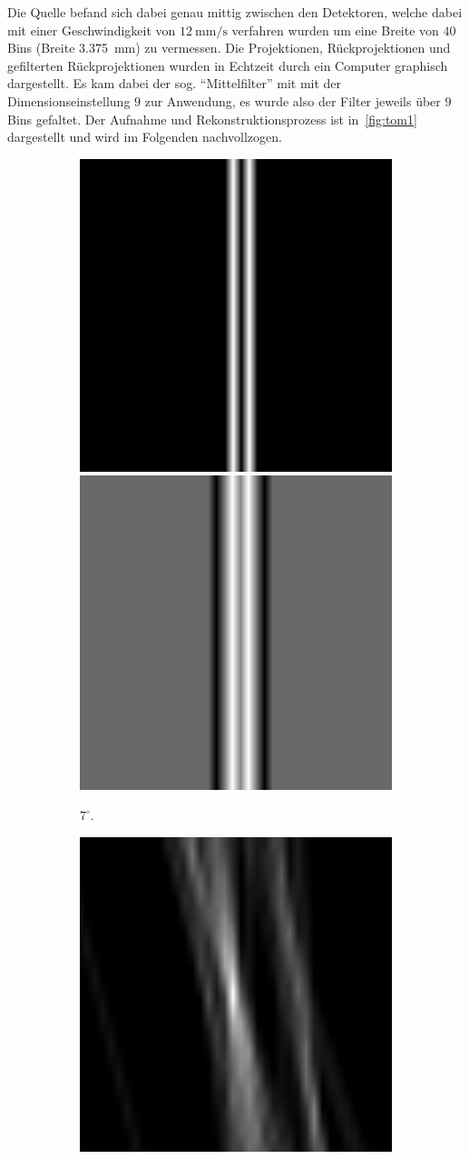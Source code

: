 \documentclass[slug=PET, room=Andreas-Schubert-Bau\,\ 424A, supervisor=Carsten\ Bittrich, coursedate=10.\ 01.\ 2020]{../../Lab_Report_LaTeX/lab_report}
\begin{document}
Die Quelle befand sich dabei genau mittig zwischen den Detektoren,
welche dabei mit einer Geschwindigkeit von
\(\SI{12}{\milli\metre\per\second}\) verfahren wurden um eine Breite
von \(40\) Bins (Breite \SI{3.375}{\milli\meter}) zu vermessen. Die
Projektionen, R\"uckprojektionen und gefilterten R\"uckprojektionen
wurden in Echtzeit durch ein Computer graphisch dargestellt. Es kam
dabei der sog. ``Mittelfilter'' mit mit der Dimensionseinstellung
\(9\) zur Anwendung, es wurde also der Filter jeweils \"uber \(9\)
Bins gefaltet. Der Aufnahme und Rekonstruktionsprozess ist
in~\ref{fig:tom1} dargestellt und wird im Folgenden nachvollzogen.

\begin{figure}[htp]
  \begin{subfigure}{0.5\textwidth}
    \centering
    \includegraphics[width=.4\textwidth]{../messungen/oliTOM1/1_einfach.png}
    \includegraphics[width=.4\textwidth]{../messungen/oliTOM1/1_gefiltert.png}
    \caption{\(7^\circ\).}
    \label{eq:tom1-7}
  \end{subfigure}
  \begin{subfigure}{0.5\textwidth}
    \centering
    \includegraphics[width=.4\textwidth]{../messungen/oliTOM1/3_einfach.png}

\end{subfigure}
\end{figure}
\end{document}
